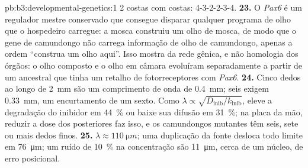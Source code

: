 \begin{solution}{pb:b3:developmental-genetics:1}
2 costas com costas: 4-3-2-2-3-4.
\textbf{23.} O \emph{Pax6} é um regulador mestre conservado que consegue
disparar qualquer programa de olho que o hospedeiro carregue: a mosca
construiu um olho de mosca, de modo que o gene de camundongo não carrega
informação de olho de camundongo, apenas a ordem ``construa um olho
aqui''. Isso mostra  da rede gênica, e não homologia
dos órgãos: o olho composto e o olho em câmara evoluíram separadamente a
partir de um ancestral que tinha um retalho de fotorreceptores com
\emph{Pax6}.
\textbf{24.} Cinco dedos ao longo de \qty{2}{mm} são um comprimento de
onda de \qty{0.4}{mm}; seis exigem \qty{0.33}{mm}, um encurtamento de um
sexto. Como $\lambda \propto \sqrt{D_{\text{inib}}/k_{\text{inib}}}$, eleve
a degradação do inibidor em \qty{44}{\%} ou baixe sua difusão em
\qty{31}{\%}; na placa da mão, reduzir a dose dos  posteriores
faz isso, e os camundongos mutantes têm seis, sete ou mais dedos finos.
\textbf{25.} $\lambda \approx \qty{110}{\micro m}$; uma duplicação da
fonte desloca todo limite em \qty{76}{\micro m}; um ruído de
\qty{10}{\%} na concentração são \qty{11}{\micro m}, cerca de um núcleo,
de erro posicional.
\end{solution}
